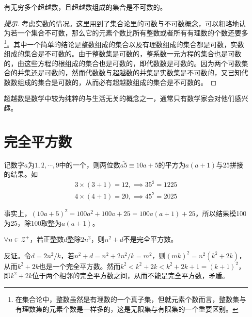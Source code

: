 \begin{theorem}
  有无穷多个超越数，且超越数组成的集合是不可数的。
\end{theorem}
\begin{proof}[提示]
  考虑实数的情况。这里用到了集合论里的可数与不可数概念，可以粗略地认为若一个集合不可数，那么它的元素个数比所有整数或者所有有理数的个数还要多\footnote{在集合论中，整数虽然是有理数的一个真子集，但就元素个数而言，整数集与有理数集的元素个数是一样多的，这是无限集与有限集的一个重要区别。}。其中一个简单的结论是整数组成的集合以及有理数组成的集合都是可数，实数组成的集合是不可数的。由于整数集是可数的，整系数一元方程的集合也是可数的，由这些方程的根组成的集合也是可数的，即代数数是可数的。因为两个可数集合的并集还是可数的，然而代数数与超越数的并集是实数集是不可数的，又已知代数数组成的集合是可数的，从而必有超越数组成的集合是不可数的。
\end{proof}

超越数是数学中较为纯粹的与生活无关的概念之一，通常只有数学家会对他们感兴趣。


\section{完全平方数}
\label{sec:perfect-squares}

\begin{example}[5结尾的两位数的平方]
  记数字$a$为$1,2,\cdots,9$中的一个，则两位数$\bar{a5}\equiv 10a + 5$的平方为$a(a+1)$与$25$拼接的结果。如
  \begin{align*}
    3\times(3+1) = 12, \implies 35^2 = 1225\\
    4\times(4+1) = 20, \implies 45^2 = 2025
  \end{align*}

  事实上，$(10a + 5)^2 = 100a^2 + 100a + 25 = 100a(a+1) + 25$，所以结果模100为25，除100取整为$a(a+1)$。
\end{example}

\begin{example}[1953 \kurschak]
  $\forall n\in\mathcal{Z}^+$，若正整数$d$整除$2n^2$，则$n^2+d$不是完全平方数。
\end{example}

\hints 反证。令$d=2n^2/k$，若$n^2+d=n^2+2n^2/k=m^2$，则$(mk)^2=n^2(k^2+2k)$，从而$k^2+2k$也是一个完全平方数。然而$k^2<k^2+2k<k^2+2k+1=(k+1)^2$，即$k^2+2k$位于两个相邻的完全平方数之间，从而不能是完全平方数，矛盾。


